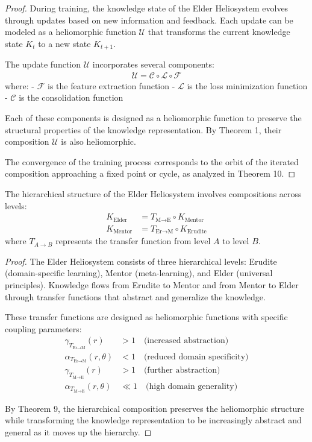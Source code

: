 \begin{proof}
During training, the knowledge state of the Elder Heliosystem evolves through updates based on new information and feedback. Each update can be modeled as a heliomorphic function $\mathcal{U}$ that transforms the current knowledge state $K_t$ to a new state $K_{t+1}$.

The update function $\mathcal{U}$ incorporates several components:
\begin{align}
\mathcal{U} = \mathcal{C} \circ \mathcal{L} \circ \mathcal{F}
\end{align}
where:
- $\mathcal{F}$ is the feature extraction function
- $\mathcal{L}$ is the loss minimization function
- $\mathcal{C}$ is the consolidation function

Each of these components is designed as a heliomorphic function to preserve the structural properties of the knowledge representation. By Theorem 1, their composition $\mathcal{U}$ is also heliomorphic.

The convergence of the training process corresponds to the orbit of the iterated composition approaching a fixed point or cycle, as analyzed in Theorem 10.
\end{proof}

\begin{theorem}
The hierarchical structure of the Elder Heliosystem involves compositions across levels:
\begin{align}
K_{\text{Elder}} &= T_{\text{M}\to\text{E}} \circ K_{\text{Mentor}}\\
K_{\text{Mentor}} &= T_{\text{Er}\to\text{M}} \circ K_{\text{Erudite}}
\end{align}
where $T_{A\to B}$ represents the transfer function from level $A$ to level $B$.
\end{theorem}

\begin{proof}
The Elder Heliosystem consists of three hierarchical levels: Erudite (domain-specific learning), Mentor (meta-learning), and Elder (universal principles). Knowledge flows from Erudite to Mentor and from Mentor to Elder through transfer functions that abstract and generalize the knowledge.

These transfer functions are designed as heliomorphic functions with specific coupling parameters:
\begin{align}
\gamma_{T_{\text{Er}\to\text{M}}}(r) &> 1 \quad \text{(increased abstraction)}\\
\alpha_{T_{\text{Er}\to\text{M}}}(r,\theta) &< 1 \quad \text{(reduced domain specificity)}\\
\gamma_{T_{\text{M}\to\text{E}}}(r) &> 1 \quad \text{(further abstraction)}\\
\alpha_{T_{\text{M}\to\text{E}}}(r,\theta) &\ll 1 \quad \text{(high domain generality)}
\end{align}

By Theorem 9, the hierarchical composition preserves the heliomorphic structure while transforming the knowledge representation to be increasingly abstract and general as it moves up the hierarchy.
\end{proof}

